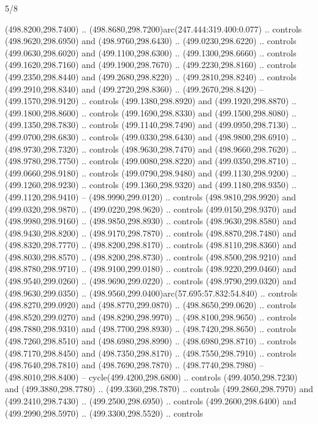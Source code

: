 \begin{flagdescription}{5/8}
\begin{scope}[xshift=0.5\flaglength,yshift=0.5\flagwidth,scale=\flagwidth/475.63]
\begin{scope}[y=0.8pt, x=0.8pt, yscale=-1, xscale=1,shift={(-450,-300)}]
\begin{scope}[cm={{1.0,0.0,0.0,1.0,(-0.0002,0.12556)}},cm={{1.0,0.0,0.0,1.0,(0.00179,0.0)}}]
\begin{scope}[cm={{1.11592,0.0,0.0,1.11592,(-106.89933,-41.77764)}}]
\begin{scope}[draw=black,fill=cfff]
\begin{scope}[fill=black]
  (498.8200,298.7400) .. (498.8680,298.7200)arc(247.444:319.400:0.077) ..
  controls (498.9620,298.6950) and (498.9760,298.6430) .. (499.0230,298.6220) ..
  controls (499.0630,298.6020) and (499.1100,298.6300) .. (499.1300,298.6660) ..
  controls (499.1620,298.7160) and (499.1900,298.7670) .. (499.2230,298.8160) ..
  controls (499.2350,298.8440) and (499.2680,298.8220) .. (499.2810,298.8240) ..
  controls (499.2910,298.8340) and (499.2720,298.8360) .. (499.2670,298.8420) --
  (499.1570,298.9120) .. controls (499.1380,298.8920) and (499.1920,298.8870) ..
  (499.1800,298.8600) .. controls (499.1690,298.8330) and (499.1500,298.8080) ..
  (499.1350,298.7830) .. controls (499.1140,298.7490) and (499.0950,298.7130) ..
  (499.0700,298.6830) .. controls (499.0330,298.6430) and (498.9800,298.6910) ..
  (498.9730,298.7320) .. controls (498.9630,298.7470) and (498.9660,298.7620) ..
  (498.9780,298.7750) .. controls (499.0080,298.8220) and (499.0350,298.8710) ..
  (499.0660,298.9180) .. controls (499.0790,298.9480) and (499.1130,298.9200) ..
  (499.1260,298.9230) .. controls (499.1360,298.9320) and (499.1180,298.9350) ..
  (499.1120,298.9410) -- (498.9990,299.0120) .. controls (498.9810,298.9920) and
  (499.0320,298.9870) .. (499.0220,298.9620) .. controls (499.0150,298.9370) and
  (498.9980,298.9160) .. (498.9850,298.8930) .. controls (498.9630,298.8580) and
  (498.9430,298.8200) .. (498.9170,298.7870) .. controls (498.8870,298.7480) and
  (498.8320,298.7770) .. (498.8200,298.8170) .. controls (498.8110,298.8360) and
  (498.8030,298.8570) .. (498.8200,298.8730) .. controls (498.8500,298.9210) and
  (498.8780,298.9710) .. (498.9100,299.0180) .. controls (498.9220,299.0460) and
  (498.9540,299.0260) .. (498.9690,299.0220) .. controls (498.9790,299.0320) and
  (498.9630,299.0350) .. (498.9560,299.0400)arc(57.695:57.832:54.840) ..
  controls (498.8270,299.0920) and (498.8770,299.0870) .. (498.8650,299.0620) ..
  controls (498.8520,299.0270) and (498.8290,298.9970) .. (498.8100,298.9650) ..
  controls (498.7880,298.9310) and (498.7700,298.8930) .. (498.7420,298.8650) ..
  controls (498.7260,298.8510) and (498.6980,298.8990) .. (498.6980,298.8710) ..
  controls (498.7170,298.8450) and (498.7350,298.8170) .. (498.7550,298.7910) ..
  controls (498.7640,298.7810) and (498.7690,298.7870) .. (498.7740,298.7980) --
  (498.8010,298.8400) -- cycle(499.4200,298.6800) .. controls
  (499.4050,298.7230) and (499.3880,298.7780) .. (499.3360,298.7870) .. controls
  (499.2860,298.7970) and (499.2410,298.7430) .. (499.2500,298.6950) .. controls
  (499.2600,298.6400) and (499.2990,298.5970) .. (499.3300,298.5520) .. controls

\end{scope}
\end{scope}
\end{scope}
\end{scope}
\end{scope}
\end{scope}
\end{flagdescription}
